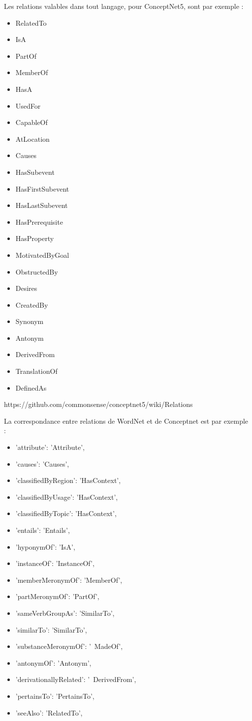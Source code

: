 \documentclass[a4paper,12pt]{article}
\begin{document}
Les relations valables dans tout langage, pour ConceptNet5, sont par exemple : 
\begin{itemize}
 \item RelatedTo
 \item IsA
 \item PartOf
 \item MemberOf
 \item HasA
 \item UsedFor
 \item CapableOf
 \item AtLocation
 \item Causes
 \item HasSubevent
 \item HasFirstSubevent
 \item HasLastSubevent
 \item HasPrerequisite
 \item HasProperty
 \item MotivatedByGoal
 \item ObstructedBy
 \item Desires
 \item CreatedBy
 \item Synonym
 \item Antonym
 \item DerivedFrom
 \item TranslationOf
 \item DefinedAs
\end{itemize}

https://github.com/commonsense/conceptnet5/wiki/Relations

La correspondance entre relations de WordNet et de Conceptnet est par exemple :
\begin{itemize}
 \item 'attribute': 'Attribute',
 \item 'causes': 'Causes',
 \item 'classifiedByRegion': 'HasContext',
 \item 'classifiedByUsage': 'HasContext',
 \item 'classifiedByTopic': 'HasContext',
 \item 'entails': 'Entails',
 \item 'hyponymOf': 'IsA',
 \item 'instanceOf': 'InstanceOf',
  \item  'memberMeronymOf': 'MemberOf',
  \item  'partMeronymOf': 'PartOf',
  \item  'sameVerbGroupAs': 'SimilarTo',
  \item  'similarTo': 'SimilarTo',
  \item  'substanceMeronymOf': '~MadeOf',
  \item  'antonymOf': 'Antonym',
  \item  'derivationallyRelated': '~DerivedFrom',
  \item  'pertainsTo': 'PertainsTo',
  \item  'seeAlso': 'RelatedTo',
\end{itemize}
\end{document}
